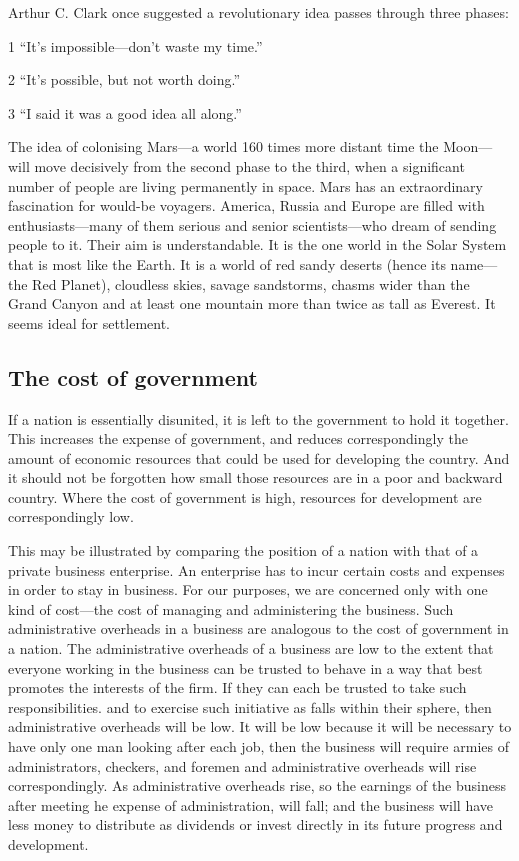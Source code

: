 \documentclass[11pt]{article}
\begin{document}
Arthur C. Clark once suggested a revolutionary idea passes through three phases:

1 ``It's impossible---don't waste my time.''

2 ``It's possible, but not worth doing.''

3 ``I said it was a good idea all along.''

The idea of colonising Mars---a world 160 times more distant time the Moon---will move decisively from the second phase to the third, when a significant number of people are living permanently in space. Mars has an extraordinary fascination for would-be voyagers. America, Russia and Europe are filled with enthusiasts---many of them serious and senior scientists---who dream of sending people to it. Their aim is understandable. It is the one world in the Solar System that is most like the Earth. It is a world of red sandy deserts (hence its name---the Red Planet), cloudless skies, savage sandstorms, chasms wider than the Grand Canyon and at least one mountain more than twice as tall as Everest. It seems ideal for settlement.
\subsection{The cost of government}
\label{sec-2-36}

If a nation is essentially disunited, it is left to the government to hold it together. This increases the expense of government, and reduces correspondingly the amount of economic resources that could be used for developing the country. And it should not be forgotten how small those resources are in a poor and backward country. Where the cost of government is high, resources for development are correspondingly low.

This may be illustrated by comparing the position of a nation with that of a private business enterprise. An enterprise has to incur certain costs and expenses in order to stay in business. For our purposes, we are concerned only with one kind of cost---the cost of managing and administering the business. Such administrative overheads in a business are analogous to the cost of government in a nation. The administrative overheads of a business are low to the extent that everyone working in the business can be trusted to behave in a way that best promotes the interests of the firm. If they can each be trusted to take such responsibilities. and to exercise such initiative as falls within their sphere, then administrative overheads will be low. It will be low because it will be necessary to have only one man looking after each job, then the business will require armies of administrators, checkers, and foremen and administrative overheads will rise correspondingly. As administrative overheads rise, so the earnings of the business after meeting he expense of administration, will fall; and the business will have less money to distribute as dividends or invest directly in its future progress and development.
\end{document}
